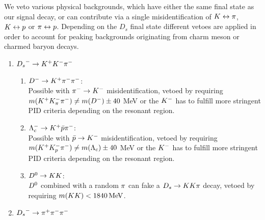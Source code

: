 We veto various physical backgrounds, which have either the same final state as our signal decay, or can contribute via a single misidentification of ${K} \leftrightarrow {\ensuremath{\pi}}$, ${K}\leftrightarrow{\ensuremath{p}}$ or $\pi \leftrightarrow{\ensuremath{p}}$. 
Depending on the $D_s$ final state different vetoes are applied in order to account for peaking backgrounds originating from charm meson or charmed baryon decays.
\begin{enumerate}

\item ${{D}_{s}}^-\rightarrow{\ensuremath{K}}^+{K}^-{\pi}^-$

\begin{enumerate}
	\item ${{D}^-} \rightarrow{\ensuremath{{K}^+}}{\ensuremath{{\pi}^-}}{\ensuremath{{\pi}^-}}$: \\
	Possible with ${{\pi}^-}\rightarrow{\ensuremath{{K}^-}}$ misidentification, vetoed by requiring 
	$m({{K}^+} K^-_\pi {\ensuremath{{\pi}^-}}) \ne m(D^-) \pm 40$ MeV 
	or the ${{K}^-}$ has to fulfill more stringent PID criteria depending on the resonant region.
	
	\item $\Lambda_c^- \rightarrow {\ensuremath{{K}^+}} \bar p {{\pi}^-} $:  \\
	Possible with $\bar p \rightarrow{\ensuremath{{K}^-}}$ misidentification, vetoed by requiring
	$m({{K}^+} K^-_p {{\pi}^-}) \ne m(\Lambda_c) \pm 40$ MeV
	or the ${{K}^-}$ has to fulfill more stringent PID criteria depending on the resonant region.
	
	\item ${{D}^0}\rightarrow{\ensuremath{K}}{\ensuremath{K}}$: \\
	${{D}^0}$ combined with a random ${\pi}$ can fake a ${{D}_{s}}\rightarrow{\ensuremath{K}}{\ensuremath{K}}{\ensuremath{\pi}}$ decay, vetoed by requiring $m({K}{K}) < 1840 \mathrm{\,Me\kern -0.1em V}$. 
\end{enumerate}

\item ${{D}_{s}}^-\rightarrow{\ensuremath{\pi}}^+{\pi}^-{\pi}^-$

\begin{enumerate}




\end{enumerate}
\end{enumerate}

